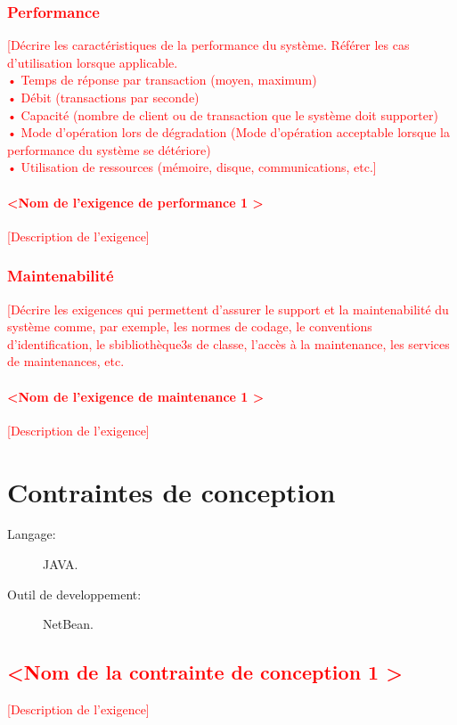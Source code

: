 \documentclass[10pt,a4paper]{report}
\begin{document}
\textcolor{red}{\subsubsection{Performance}
[Décrire les caractéristiques de la performance du système. Référer les cas d’utilisation lorsque applicable.\\
•	Temps de réponse par transaction (moyen, maximum)\\
•	Débit (transactions par seconde)\\
•	Capacité (nombre de client ou de transaction que le système doit supporter)\\
•	Mode d’opération lors de dégradation (Mode d’opération acceptable lorsque la performance du système se détériore)\\
•	Utilisation de ressources (mémoire, disque, communications, etc.]
\paragraph{\textless Nom de l’exigence de performance 1 \textgreater}
[Description de l’exigence]}

\textcolor{red}{\subsubsection{Maintenabilité}
[Décrire les exigences qui permettent d’assurer le support et la maintenabilité du système comme, par exemple, les normes de codage, le conventions d’identification, le sbibliothèque3s de classe, l’accès à la maintenance, les services de maintenances, etc. 
\paragraph{\textless Nom de l’exigence de maintenance 1 \textgreater}
[Description de l’exigence]}


\section{Contraintes de conception}
\begin{description}
\item[Langage:] JAVA.
\item[Outil de developpement:] NetBean.
\end{description}
\textcolor{red}{\subsection{\textless Nom de la contrainte de conception 1 \textgreater}
[Description de l’exigence]}
\end{document}
